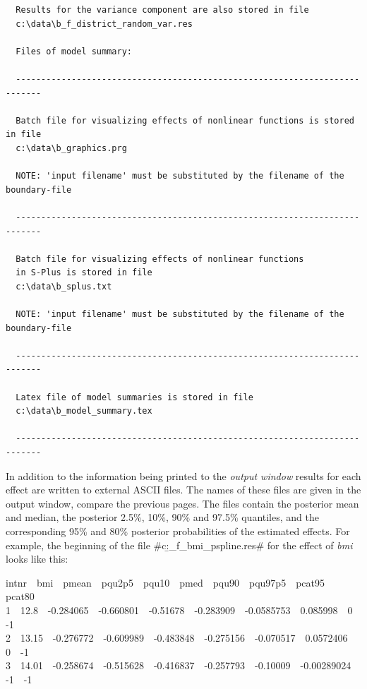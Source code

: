 \documentclass{article}
\begin{document}
\begin{verbatim}
  Results for the variance component are also stored in file
  c:\data\b_f_district_random_var.res

  Files of model summary:

  ---------------------------------------------------------------------------

  Batch file for visualizing effects of nonlinear functions is stored in file
  c:\data\b_graphics.prg

  NOTE: 'input filename' must be substituted by the filename of the boundary-file

  ---------------------------------------------------------------------------

  Batch file for visualizing effects of nonlinear functions
  in S-Plus is stored in file
  c:\data\b_splus.txt

  NOTE: 'input filename' must be substituted by the filename of the boundary-file

  ---------------------------------------------------------------------------

  Latex file of model summaries is stored in file
  c:\data\b_model_summary.tex

  ---------------------------------------------------------------------------
\end{verbatim}
\normalsize

In addition to the information being printed to the {\em output
window} results for each effect are written to external ASCII
files. The names of these files are given in the output window,
compare the previous pages. The files contain the posterior mean
and median, the posterior 2.5\%, 10\%, 90\% and 97.5\% quantiles,
and the corresponding 95\% and 80\% posterior probabilities of the
estimated effects. For example, the beginning of the file
#c:\data\b_f_bmi_pspline.res# for the effect of {\em bmi} looks
like this:

{\footnotesize
 intnr \,\, bmi \,\, pmean \,\, pqu2p5 \,\, pqu10 \,\, pmed \,\, pqu90 \,\, pqu97p5 \,\, pcat95 \,\, pcat80\\
 1 \,\, 12.8 \,\, -0.284065 \,\, -0.660801 \,\, -0.51678 \,\, -0.283909 \,\, -0.0585753 \,\, 0.085998 \,\, 0 \,\, -1\\
 2 \,\, 13.15 \,\, -0.276772 \,\, -0.609989 \,\, -0.483848 \,\, -0.275156 \,\, -0.070517 \,\, 0.0572406 \,\, 0 \,\, -1\\
 3 \,\, 14.01 \,\, -0.258674 \,\, -0.515628 \,\, -0.416837 \,\, -0.257793 \,\, -0.10009 \,\, -0.00289024 \,\, -1 \,\, -1}
\end{document}

